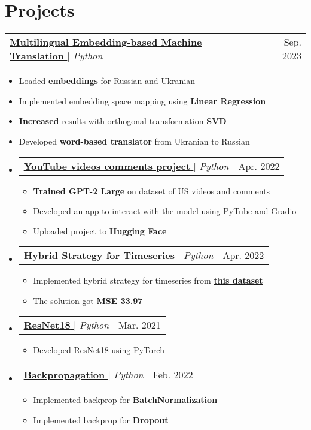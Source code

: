 \documentclass[english,russian,letterpaper,11pt]{article}
\makeatletter
\newcommand{\resumeItem}[1]{
  \item\small{
    {#1 \vspace{-2pt}}
  }
}
\newcommand{\resumeProjectHeading}[2]{
    \item
    \begin{tabular*}{0.97\textwidth}{l@{\extracolsep{\fill}}r}
      \small#1 & #2 \\
    \end{tabular*}\vspace{-7pt}
}
\newcommand{\resumeSubHeadingListStart}{\begin{itemize}[leftmargin=0.15in, label={}]}
\newcommand{\resumeSubHeadingListEnd}{\end{itemize}}
\newcommand{\resumeItemListStart}{\begin{itemize}}
\newcommand{\resumeItemListEnd}{\end{itemize}\vspace{-5pt}}
\makeatother
\begin{document}
\section{Projects}
    \resumeProjectHeading
    {\href{https://github.com/alexbuyan/nlp_course/blob/2023/week01_embeddings/homework.ipynb}{\underline{\textbf{Multilingual Embedding-based Machine Translation}} \faGithub} $|$ \emph{Python}}{Sep. 2023}
    \resumeItemListStart
    \resumeItem{Loaded \textbf{embeddings} for Russian and Ukranian}
    \resumeItem{Implemented embedding space mapping using \textbf{Linear Regression}}
    \resumeItem{\textbf{Increased} results with orthogonal transformation \textbf{SVD}}
    \resumeItem{Developed \textbf{word-based translator} from Ukranian to Russian}
    \resumeItemListEnd
    \resumeSubHeadingListStart
    \resumeProjectHeading
          {\href{https://huggingface.co/spaces/alexbuyan/yt_videos_comments_devops_projects}{\underline{\textbf{YouTube videos comments project}} \faGithub} $|$ \emph{Python}}{Apr. 2022}
          \resumeItemListStart
            \resumeItem{\textbf{Trained GPT-2 Large} on dataset of US videos and comments}
            \resumeItem{Developed an app to interact with the model using PyTube and Gradio}
            \resumeItem{Uploaded project to \textbf{Hugging Face}}
          \resumeItemListEnd
    \resumeProjectHeading
        {\href{https://github.com/alexbuyan/BPKproject}{\underline{\textbf{Hybrid Strategy for Timeseries}} \faGithub} $|$ \emph{Python}}{Apr. 2022}
        \resumeItemListStart
          \resumeItem{Implemented hybrid strategy for timeseries from \href{https://www.kaggle.com/c/demand-forecasting-kernels-only}{\textbf{this dataset}}}
          \resumeItem{The solution got \textbf{MSE 33.97}}
        \resumeItemListEnd
        \resumeProjectHeading
            {\href{https://github.com/alexbuyan/BPKproject}{\underline{\textbf{ResNet18}} \faGithub} $|$ \emph{Python}}{Mar. 2021}
            \resumeItemListStart
              \resumeItem{Developed ResNet18 using PyTorch}
            \resumeItemListEnd
    \resumeProjectHeading
    {\href{https://github.com/alexbuyan/BPKproject}{\underline{\textbf{Backpropagation}} \faGithub} $|$ \emph{Python}}{Feb. 2022}
    \resumeItemListStart
    \resumeItem{Implemented backprop for \textbf{BatchNormalization}}
    \resumeItem{Implemented backprop for \textbf{Dropout}}
    \resumeItemListEnd
    \resumeSubHeadingListEnd

\end{document}
